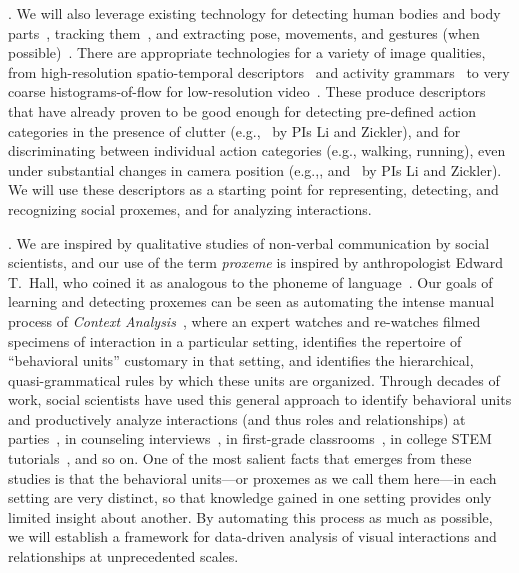 . We will also leverage existing technology for detecting human bodies and body parts~\cite{Dalal:HOG,poselet,pose_part}, tracking them~\cite{RamananFZ07,EshelM10}, and extracting pose, movements, and gestures (when possible)~\cite{Mitra:gesture,Ryoo:action,Poppe}. There are appropriate technologies for a variety of image qualities, from high-resolution spatio-temporal descriptors~\cite{Dollar:STIP,Laptev:STIP,Brox:flow} and activity grammars~\cite{Niebles2007,Niebles2006} to very coarse histograms-of-flow for low-resolution video~\cite{EfrosBMM03}. These produce descriptors that have already proven to be good enough for detecting pre-defined action categories in the presence of clutter (e.g.,~\cite{groupdet2013, Li2010} by PIs Li and Zickler), and for discriminating between individual action categories (e.g., walking, running), even under substantial changes in camera position (e.g.,\cite{Weinland:invariance2}, and~\cite{LiZickler2012} by PIs Li and Zickler). We will use these descriptors as a starting point for representing, detecting, and recognizing social proxemes, and for analyzing interactions.





. We are inspired by qualitative studies of non-verbal communication by social scientists, and our use of the term \emph{proxeme} is inspired by anthropologist Edward T.~Hall, who coined it as analogous to the phoneme of language~\cite{hall1974}. Our goals of learning and detecting proxemes can be seen as automating the intense manual process of \emph{Context Analysis}~\cite{Kendon1990}, where an expert watches and re-watches filmed specimens of interaction in a particular setting, identifies the repertoire of ``behavioral units'' customary in that setting, and identifies the hierarchical, quasi-grammatical rules by which these units are organized. Through decades of work, social scientists have used this general approach to identify behavioral units and productively analyze interactions (and thus roles and relationships) at parties~\cite{Kendon1990}, in counseling interviews~\cite{erickson1982counselor}, in first-grade classrooms~\cite{mcdermott1978criteria}, in college STEM tutorials~\cite{Scherr2009}, and so on. One of the most salient facts that emerges from these studies is that the behavioral units---or proxemes as we call them here---in each setting are very distinct, so that knowledge gained in one setting provides only limited insight about another. By automating this process as much as possible, we will establish a framework for data-driven analysis of visual interactions and relationships at unprecedented scales.

